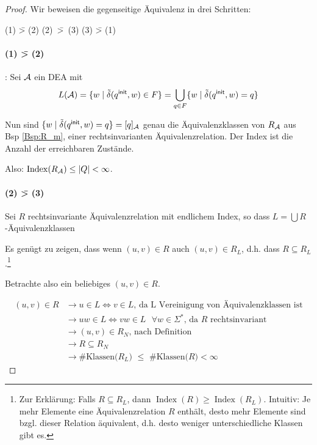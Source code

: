 \begin{proof}
  Wir beweisen die gegenseitige Äquivalenz in drei Schritten:

  \begin{center}
    (1) \=> (2) \quad \mbox{(2) \=> (3)} \quad (3) \=> (1)
  \end{center}

        \paragraph{(1) \=> (2)}: Sei $\mathcal{A}$ ein \ac{DEA} mit
  \begin{displaymath}
    L(\mathcal{A})=\{w \mid \tilde\delta({q^\mathsf{init}},w)\in F \} = \bigcup_{q \in F} \{ w \mid \tilde\delta({q^\mathsf{init}},w) = q\}
\end{displaymath}

Nun sind $\{ w \mid \tilde\delta({q^\mathsf{init}},w)=q \} = [q]_{\mathcal{A}}$ genau die Äquivalenzklassen von $R_{\mathcal{A}}$ aus Bsp \ref{Bsp:R_m}, einer rechtsinvarianten Äquivalenzrelation.
Der Index ist die Anzahl der erreichbaren Zustände.

Also: $\operatorname{Index}(R_{\mathcal{A}}) \le |Q| < \infty$.
        
\paragraph{(2) \=> (3)} Sei $R$ rechtsinvariante Äquivalenzrelation mit endlichem Index, so dass $L=\bigcup R$-Äquivalenzklassen
        
Es genügt zu zeigen, dass wenn $(u,v)\in R$ auch $(u,v)\in R_L $, d.h. dass $R \subseteq R_L$.\footnote{
Zur Erklärung: Falls $R \subseteq R_L$, dann $\operatorname{Index}(R) \ge \operatorname{Index}(R_L)$.
Intuitiv: Je mehr Elemente eine Äquivalenzrelation $R$ enthält, desto mehr Elemente sind bzgl. dieser Relation äquivalent, d.h. desto weniger unterschiedliche Klassen gibt es.}

Betrachte also ein beliebiges $(u, v) \in R$.

\begin{align*}
(u, v) \in R & \rightarrow u \in L \Leftrightarrow v \in L \text{, da L Vereinigung von Äquivalenzklassen ist} \\
& \rightarrow uw \in L \Leftrightarrow vw \in L \text{ $\forall w \in \Sigma^*$, da $R$ rechtsinvariant } \\
& \rightarrow (u, v) \in R_N \text{, nach Definition}\\
& \rightarrow R \subseteq R_N \\
& \rightarrow \text{\#Klassen($R_L$) $\leq$ \#Klassen($R$)}<\infty
\end{align*}



\end{proof}
